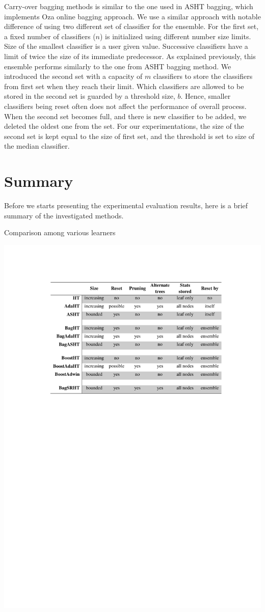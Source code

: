 Carry-over bagging methods is similar to the one used in ASHT bagging, which implements Oza online bagging approach. We use a similar approach with notable difference of using two different set of classifier for the ensemble. For the first set, a fixed number of classifiers ($n$) is initialized using different number size limits. Size of the smallest classifier is a user given value. Successive classifiers have a limit of twice the size of its immediate predecessor. As explained previously, this ensemble performs similarly to the one from ASHT bagging method. We introduced the second set with a capacity of $m$ classifiers to store the classifiers from first set when they reach their limit. Which classifiers are allowed to be stored in the second set is guarded by a threshold size, $b$. Hence, smaller classifiers being reset often does not affect the performance of overall process. When the second set becomes full, and there is new classifier to be added, we deleted the oldest one from the set. For our experimentations, the size of the second set is kept equal to the size of first set, and the threshold is set to size of the median classifier. 


\section{Summary}
Before we starts presenting the experimental evaluation results, here is a brief summary of the investigated methods.

\begin{table}[htbp]
    \caption{Comparison among various learners}
    \label{tab:treecomp}
    \vspace{-5mm}
    \begin{center}
    \includegraphics{figs/treescomp.pdf}
    \end{center}
\end{table}

